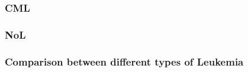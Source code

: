 \documentclass[10pt,dvipsnames,table]{beamer}
\DeclarePairedDelimiter\ceil{\lceil}{\rceil}
\begin{document}
\begin{frame}
\frametitle{CML}

\end{frame}

\begin{frame}
\frametitle{NoL}

\end{frame}

\begin{frame}
\frametitle{Comparison between different types of Leukemia}

\end{frame}





\end{document}
